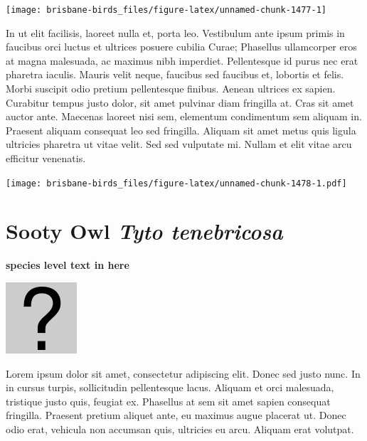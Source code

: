 \documentclass[]{book}
\let\origfigure\figure
\let\endorigfigure\endfigure
\renewenvironment{figure}[1][2] {
  \expandafter\origfigure\expandafter[H]
} {
  \endorigfigure
}
\begin{document}
\begin{figure}
\texttt{[image: brisbane-birds\_files/figure-latex/unnamed-chunk-1477-1]} \caption{insert figure caption}\label{fig:unnamed-chunk-1477}
\end{figure}

In ut elit facilisis, laoreet nulla et, porta leo. Vestibulum ante ipsum
primis in faucibus orci luctus et ultrices posuere cubilia Curae;
Phasellus ullamcorper eros at magna malesuada, ac maximus nibh
imperdiet. Pellentesque id purus nec erat pharetra iaculis. Mauris velit
neque, faucibus sed faucibus et, lobortis et felis. Morbi suscipit odio
pretium pellentesque finibus. Aenean ultrices ex sapien. Curabitur
tempus justo dolor, sit amet pulvinar diam fringilla at. Cras sit amet
auctor ante. Maecenas laoreet nisi sem, elementum condimentum sem
aliquam in. Praesent aliquam consequat leo sed fringilla. Aliquam sit
amet metus quis ligula ultricies pharetra ut vitae velit. Sed sed
vulputate mi. Nullam et elit vitae arcu efficitur venenatis.

\begin{figure}
\centering
\texttt{[image: brisbane-birds\_files/figure-latex/unnamed-chunk-1478-1.pdf]}
\caption{\label{fig:unnamed-chunk-1478}insert figure caption}
\end{figure}

\section{\texorpdfstring{Sooty Owl \emph{Tyto
tenebricosa}}{Sooty Owl Tyto tenebricosa}}\label{sooty-owl-tyto-tenebricosa}

\textbf{species level text in here}

\begin{figure}
\centering
\includegraphics{assets/missing.png}
\caption{No image for species}
\end{figure}

Lorem ipsum dolor sit amet, consectetur adipiscing elit. Donec sed justo
nunc. In in cursus turpis, sollicitudin pellentesque lacus. Aliquam et
orci malesuada, tristique justo quis, feugiat ex. Phasellus at sem sit
amet sapien consequat fringilla. Praesent pretium aliquet ante, eu
maximus augue placerat ut. Donec odio erat, vehicula non accumsan quis,
ultricies eu arcu. Aliquam erat volutpat.
\end{document}
